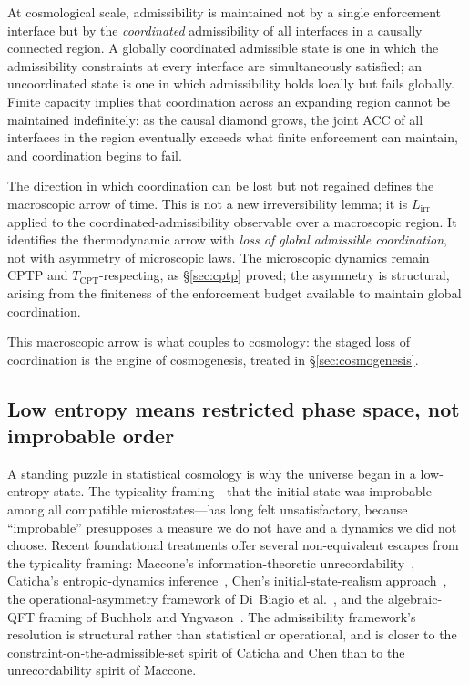 \documentclass[11pt]{article}
\begin{document}
At cosmological scale, admissibility is maintained not by a single
enforcement interface but by the \emph{coordinated} admissibility of all
interfaces in a causally connected region.  A globally coordinated
admissible state is one in which the admissibility constraints at every
interface are simultaneously satisfied; an uncoordinated state is one in
which admissibility holds locally but fails globally.  Finite capacity
implies that coordination across an expanding region cannot be maintained
indefinitely: as the causal diamond grows, the joint ACC of all interfaces
in the region eventually exceeds what finite enforcement can maintain, and
coordination begins to fail.

The direction in which coordination can be lost but not regained defines
the macroscopic arrow of time.  This is not a new irreversibility lemma;
it is $L_{\mathrm{irr}}$ applied to the coordinated-admissibility
observable over a macroscopic region.  It identifies the thermodynamic
arrow with \emph{loss of global admissible coordination}, not with
asymmetry of microscopic laws.  The microscopic dynamics remain CPTP and
$T_{\mathrm{CPT}}$-respecting, as \S\ref{sec:cptp} proved; the asymmetry is
structural, arising from the finiteness of the enforcement budget
available to maintain global coordination.

This macroscopic arrow is what couples to cosmology: the staged loss of
coordination is the engine of cosmogenesis, treated in
\S\ref{sec:cosmogenesis}.

\subsection{Low entropy means restricted phase space, not improbable order}
\label{subsec:arrow_restricted_phasespace}

A standing puzzle in statistical cosmology is why the universe began in a
low-entropy state.  The typicality framing---that the initial state was
improbable among all compatible microstates---has long felt unsatisfactory,
because ``improbable'' presupposes a measure we do not have and a dynamics
we did not choose.  Recent foundational treatments offer several non-equivalent
escapes from the typicality framing: Maccone's information-theoretic
unrecordability~\cite{Maccone2009}, Caticha's entropic-dynamics
inference~\cite{Caticha2011}, Chen's initial-state-realism approach~\cite{Chen2019},
the operational-asymmetry framework of Di~Biagio et al.~\cite{DiBiagio2021},
and the algebraic-QFT framing of Buchholz and Yngvason~\cite{Buchholz2023}.
The admissibility framework's resolution is structural rather than statistical
or operational, and is closer to the constraint-on-the-admissible-set spirit
of Caticha and Chen than to the unrecordability spirit of Maccone.
\end{document}

